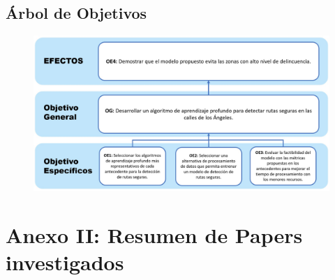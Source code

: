 \section{Árbol de Objetivos}
	\label{anexo2}
	\begin{figure}[h]
		\begin{center}
			\includegraphics[width=1.05\textwidth]{anexos/OBJETIVOS.jpg}
		\end{center}
	\end{figure}
	\clearpage

\chapter{Anexo II: Resumen de Papers investigados}

